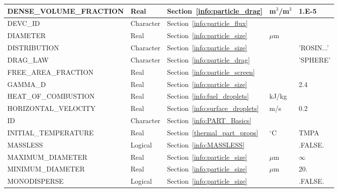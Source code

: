 \documentclass[11pt]{book}
\begin{document}
\begin{longtable}{@{\extracolsep{\fill}}|l|l|l|l|l|}
{\ct DENSE\_VOLUME\_FRACTION}       & Real            & Section~\ref{info:particle_drag}        & m$^3$/m$^3$ & 1.E-5         \\ \hline
{\ct DEVC\_ID}                      & Character       & Section~\ref{info:particle_flux}        &           &               \\ \hline
{\ct DIAMETER}                      & Real            & Section~\ref{info:particle_size}        & $\mu$m    &               \\ \hline
{\ct DISTRIBUTION}                  & Character       & Section~\ref{info:particle_size}        &           & {\ct 'ROSIN...'} \\ \hline
{\ct DRAG\_LAW}                     & Character       & Section~\ref{info:particle_drag}        &           & {\ct 'SPHERE'}\\ \hline
{\ct FREE\_AREA\_FRACTION}          & Real            & Section~\ref{info:particle_screen}               &           &               \\ \hline
{\ct GAMMA\_D}                      & Real            & Section~\ref{info:particle_size}        &           & 2.4           \\ \hline
{\ct HEAT\_OF\_COMBUSTION}          & Real            & Section~\ref{info:fuel_droplets}        & kJ/kg     &               \\ \hline
{\ct HORIZONTAL\_VELOCITY}          & Real            & Section~\ref{info:surface_droplets}     & m/s       &  0.2          \\ \hline
{\ct ID}                            & Character       & Section~\ref{info:PART_Basics}          &           &               \\ \hline
{\ct INITIAL\_TEMPERATURE}          & Real            & Section~\ref{thermal_part_props}        & $^\circ$C & {\ct TMPA}    \\ \hline
{\ct MASSLESS}                      & Logical         & Section~\ref{info:MASSLESS}             &           & {\ct .FALSE.} \\ \hline
{\ct MAXIMUM\_DIAMETER}             & Real            & Section~\ref{info:particle_size}        & $\mu$m    & $\infty$      \\ \hline
{\ct MINIMUM\_DIAMETER}             & Real            & Section~\ref{info:particle_size}        & $\mu$m    & 20.           \\ \hline
{\ct MONODISPERSE}                  & Logical         & Section~\ref{info:particle_size}        &           & {\ct .FALSE.} \\ \hline

\end{longtable}
\end{document}
